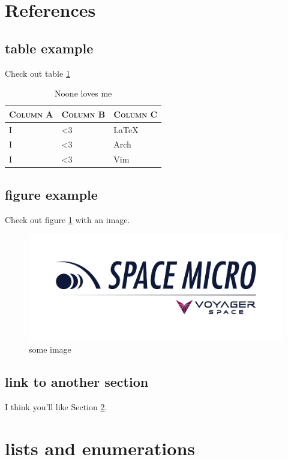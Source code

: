 \documentclass[oneside,english,chapters]{smireport}
\providecommand{\tabularnewline}{\\}
\begin{document}
\section{References}
\subsection{table example}
Check out table \ref{tab:uselesstable}

\begin{table}[H]
  \begin{tabular}{|>{\centering}p{}|>{\centering}p{}|>{\centering}p{}|}
    \hline
    \textbf{\textsc{Column A}} & \textbf{\textsc{Column B}} & \textbf{\textsc{Column C}}\tabularnewline
    \hline
    \hline
    I & <3 & LaTeX\tabularnewline
    \hline
    I & <3 & Arch\tabularnewline
    \hline
    I & <3 & Vim\tabularnewline
    \hline
  \end{tabular}
  \caption{Noone loves me}\label{tab:uselesstable}
\end{table}

\subsection{figure example}
Check out figure \ref{fig:image} with an image.

\begin{figure}
  \begin{center}\includegraphics[width=0.25\columnwidth,height=0.25\textheight,keepaspectratio]{./images/smi-logo.png}\end{center}
\caption{some image}\label{fig:image}
\end{figure}

\subsection{link to another section}
I think you'll like Section \ref{sec:landn}.

\section{lists and enumerations}
\label{sec:landn}
\end{document}
